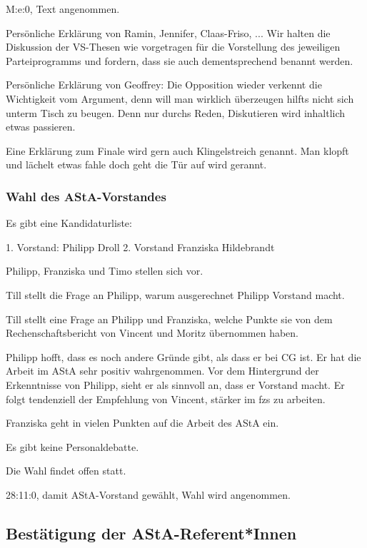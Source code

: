 \documentclass[ngerman,headheight=70pt]{scrartcl}
\begin{document}
    M:e:0, Text angenommen.

    Persönliche Erklärung von Ramin, Jennifer, Claas-Friso, ...
    Wir halten die Diskussion der VS-Thesen wie vorgetragen für die Vorstellung
    des jeweiligen Parteiprogramms und fordern, dass sie auch dementsprechend
    benannt werden.

    Persönliche Erklärung von Geoffrey:
    Die Opposition wieder verkennt
    die Wichtigkeit vom Argument,
    denn will man wirklich überzeugen
    hilfts nicht sich unterm Tisch zu beugen.
    Denn nur durchs Reden, Diskutieren
    wird inhaltlich etwas passieren.

    Eine Erklärung zum Finale
    wird gern auch Klingelstreich genannt.
    Man klopft und lächelt etwas fahle
    doch geht die Tür auf wird gerannt.

    \subsubsection{Wahl des AStA-Vorstandes}

    Es gibt eine Kandidaturliste:

    1. Vorstand: Philipp Droll
    2. Vorstand Franziska Hildebrandt

    Philipp, Franziska und Timo stellen sich vor.

    Till stellt die Frage an Philipp, warum ausgerechnet
    Philipp Vorstand macht.

    Till stellt eine Frage an Philipp und Franziska, welche Punkte sie
    von dem Rechenschaftsbericht von Vincent und Moritz übernommen haben.

    Philipp hofft, dass es noch andere Gründe gibt, als dass er bei CG ist.
    Er hat die Arbeit im AStA sehr positiv wahrgenommen. Vor dem Hintergrund
    der Erkenntnisse von Philipp, sieht er als sinnvoll an, dass er Vorstand
    macht. Er folgt tendenziell der Empfehlung von Vincent, stärker im fzs
    zu arbeiten.

    Franziska geht in vielen Punkten auf die Arbeit des AStA ein.

    Es gibt keine Personaldebatte.

    Die Wahl findet offen statt.

    28:11:0, damit AStA-Vorstand gewählt, Wahl wird angenommen.

    \subsection{Bestätigung der AStA-Referent*Innen}
\end{document}
